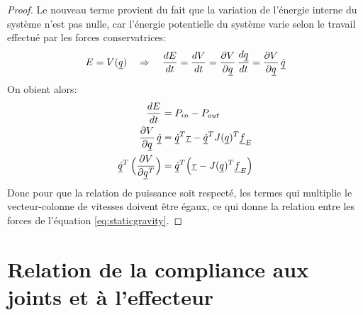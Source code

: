 
\begin{proof}
Le nouveau terme provient du fait que la variation de l'énergie interne du système n'est pas nulle, car l'énergie potentielle du système varie selon le travail effectué par les forces conservatrices:
\begin{align}
E = V( \underline{q} ) \quad \Rightarrow \quad \frac{dE}{dt} = \frac{dV}{dt} = \frac{\partial V}{ \partial \underline{q}} \, \frac{d \underline{q}}{dt} = \frac{\partial V}{ \partial \underline{q}} \, \underline{\dot{q}}
\end{align}
On obient alors:
\begin{align}
\frac{dE}{dt} &= P_{in} - P_{out} \\
\frac{\partial V}{ \partial \underline{q}} \, \underline{\dot{q}} &=  \underline{\dot{q}}^T \underline{\tau} - \underline{\dot{q}}^T  J( \underline{q})^T \underline{f}_E  \\
\underline{\dot{q}}^T  \, \Big(  \frac{\partial V}{ \partial \underline{q}^T} \Big) &=  \underline{\dot{q}}^T  \Big(\underline{\tau} -  J( \underline{q})^T \underline{f}_E  \Big)
\end{align}
Donc pour que la relation de puissance soit respecté, les termes qui multiplie le vecteur-colonne de vitesses doivent être égaux, ce qui donne la relation entre les forces de l'équation \eqref{eq:staticgravity}.
\end{proof}




\newpage
\section{Relation de la compliance aux joints et à l'effecteur}
\label{sec:manipcompliance}

